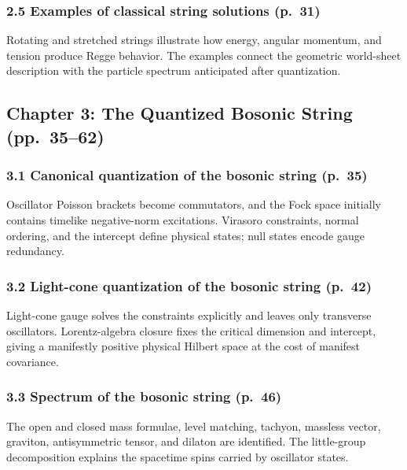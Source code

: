 \documentclass[
  10pt,
  a4paper,
  openany]{book}
\begin{document}
\subsubsection{2.5 Examples of classical string solutions
(p.~31)}\label{examples-of-classical-string-solutions-p.-31}

Rotating and stretched strings illustrate how energy, angular momentum,
and tension produce Regge behavior. The examples connect the geometric
world-sheet description with the particle spectrum anticipated after
quantization.

\subsection{Chapter 3: The Quantized Bosonic String
(pp.~35--62)}\label{chapter-3-the-quantized-bosonic-string-pp.-3562}

\subsubsection{3.1 Canonical quantization of the bosonic string
(p.~35)}\label{canonical-quantization-of-the-bosonic-string-p.-35}

Oscillator Poisson brackets become commutators, and the Fock space
initially contains timelike negative-norm excitations. Virasoro
constraints, normal ordering, and the intercept define physical states;
null states encode gauge redundancy.

\subsubsection{3.2 Light-cone quantization of the bosonic string
(p.~42)}\label{light-cone-quantization-of-the-bosonic-string-p.-42}

Light-cone gauge solves the constraints explicitly and leaves only
transverse oscillators. Lorentz-algebra closure fixes the critical
dimension and intercept, giving a manifestly positive physical Hilbert
space at the cost of manifest covariance.

\subsubsection{3.3 Spectrum of the bosonic string
(p.~46)}\label{spectrum-of-the-bosonic-string-p.-46}

The open and closed mass formulae, level matching, tachyon, massless
vector, graviton, antisymmetric tensor, and dilaton are identified. The
little-group decomposition explains the spacetime spins carried by
oscillator states.
\end{document}
